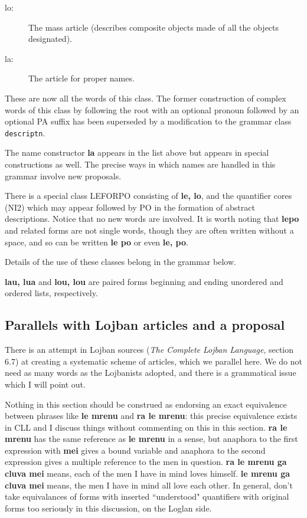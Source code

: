 \documentclass[12pt]{book}
\begin{document}
{\begin{description}
\item[lo:]  The mass article (describes composite objects made of all the objects designated).

\item[la:]   The article for proper names.
\end{description}


These are now all the words of this class.  The former construction of complex words of this class
by following the root with an optional pronoun followed by an optional PA suffix has been superseded by a modification to the grammar class {\tt descriptn}.

The name constructor {\bf la} appears in the list above but appears in special constructions as well.   The precise ways in which names are handled in this grammar involve new proposals.

There is a special class LEFORPO consisting of {\bf le, lo}, and the quantifier cores (NI2) which may appear
followed by PO in the formation of abstract descriptions.   Notice that no new words are involved.  It is worth noting that {\bf lepo} and related forms are
not single words, though they are often written without a space, and so can be written {\bf le po} or even {\bf le, po}.

Details of the use of these classes belong in the grammar below.

{\bf lau, lua} and {\bf lou, lou} are paired forms beginning and ending unordered and ordered lists, respectively. 

\subsection{Parallels with Lojban articles and a proposal}

There is an attempt in Lojban sources ({\em The Complete Lojban Language\/}, section 6.7)  at creating a systematic scheme of articles, which we parallel here.  We do not need as many words as the Lojbanists adopted, and there is a grammatical issue which I will point out.

Nothing in this section should be construed as endorsing an exact equivalence between phrases like {\bf le mrenu} and {\bf ra le mrenu}:  this precise equivalence exists in CLL and I discuss things without commenting on this in this section.  {\bf ra le mrenu} has the same reference as {\bf le mrenu} in a sense, but anaphora to the first expression with {\bf mei} gives a bound variable and anaphora to the second expression gives a multiple reference to the men in question.  {\bf ra le mrenu ga cluva mei} means, each of the men I have in mind loves himself.  {\bf le mrenu ga cluva mei} means, the men I have in mind all love each other.  In general, don't take equivalances of forms with inserted ``understood" quantifiers with original forms too seriously in this discussion, on the Loglan side.

}
\end{document}
